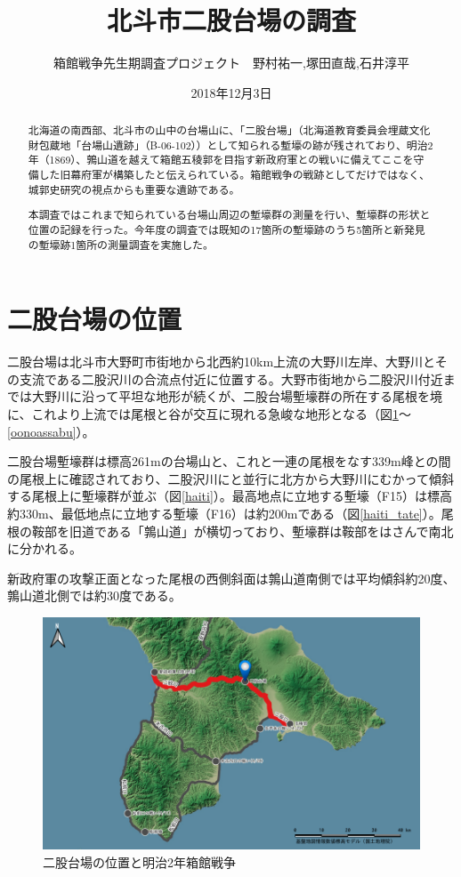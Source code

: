 \documentclass[14Q]{jsarticle}
\title{北斗市二股台場の調査}%
\date{2018年12月3日}
\author{箱館戦争先生期調査プロジェクト　野村祐一,塚田直哉,石井淳平}              %
\begin{document}
\maketitle
\begin{abstract}
北海道の南西部、北斗市の山中の台場山に、「二股台場」（北海道教育委員会埋蔵文化財包蔵地「台場山遺跡」（B-06-102））として知られる塹壕の跡が残されており、明治2年（1869）、鶉山道を越えて箱館五稜郭を目指す新政府軍との戦いに備えてここを守備した旧幕府軍が構築したと伝えられている。箱館戦争の戦跡としてだけではなく、城郭史研究の視点からも重要な遺跡である。

本調査ではこれまで知られている台場山周辺の塹壕群の測量を行い、塹壕群の形状と位置の記録を行った。今年度の調査では既知の17箇所の塹壕跡のうち5箇所と新発見の塹壕跡1箇所の測量調査を実施した。
\end{abstract}

\section{二股台場の位置}
二股台場は北斗市大野町市街地から北西約10km上流の大野川左岸、大野川とその支流である二股沢川の合流点付近に位置する。大野市街地から二股沢川付近までは大野川に沿って平坦な地形が続くが、二股台場塹壕群の所在する尾根を境に、これより上流では尾根と谷が交互に現れる急峻な地形となる（図\ref{dounan}〜\ref{oonoassabu}）。

二股台場塹壕群は標高261mの台場山と、これと一連の尾根をなす339m峰との間の尾根上に確認されており、二股沢川にと並行に北方から大野川にむかって傾斜する尾根上に塹壕群が並ぶ（図\ref{haiti}）。最高地点に立地する塹壕（F15）は標高約330m、最低地点に立地する塹壕（F16）は約200mである（図\ref{haiti_tate}）。尾根の鞍部を旧道である「鶉山道」が横切っており、塹壕群は鞍部をはさんで南北に分かれる。

新政府軍の攻撃正面となった尾根の西側斜面は鶉山道南側では平均傾斜約20度、鶉山道北側では約30度である。

\begin{figure}[h]
\centering
\includegraphics[width=160truemm]{fig/dounan.pdf}
\caption{二股台場の位置と明治2年箱館戦争}
\label{dounan}
\end{figure}
\end{document}
